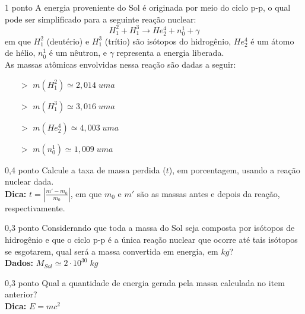 \documentclass{../lista}
\begin{document}
	\begin{questao}{1 ponto}
		A energia proveniente do Sol é originada por meio do ciclo p-p, o qual pode ser simplificado para a seguinte reação nuclear:
		\begin{equation}
			H_1^2 + H_1^3 \longrightarrow He_2^4 + n_0^1 + \gamma
		\end{equation}
		em que $H_1^2$ (deutério) e $H_1^3$ (trítio) são isótopos do hidrogênio, $He_2^4$ é um átomo de hélio, $n_0^1$ é um nêutron, e $\gamma$ representa a energia liberada. \\
		As massas atômicas envolvidas nessa reação são dadas a seguir:
		\begin{multicols}{2} \begin{itemize}
			\item[$>$] $m(H_1^2) \simeq 2,014 \; uma$
			\item[$>$] $m(H_1^3) \simeq 3,016 \; uma$
			\item[$>$] $m(He_2^4) \simeq 4,003 \; uma$
			\item[$>$] $m(n_0^1) \simeq 1,009 \; uma$
		\end{itemize} \end{multicols}

		\begin{pergunta}{0,4 ponto}
			Calcule a taxa de massa perdida ($t$), em porcentagem, usando a reação nuclear dada. \\
			\textbf{Dica:} $t= \left| \frac{m'-m_0}{m_0} \right|$, em que $m_0$ e $m'$ são as massas antes e depois da reação, respectivamente.
			
			\espacoCalculo
			\espacoRespostaPergunta
		\end{pergunta}

		\begin{pergunta}{0,3 ponto}
			Considerando que toda a massa do Sol seja composta por isótopos de hidrogênio e que o ciclo p-p é a única reação nuclear que ocorre até tais isótopos se esgotarem, qual será a massa convertida em energia, em $kg$? \\
			\textbf{Dados:} $M_{Sol} \simeq 2 \cdot 10^{30} \; kg$
			
			\espacoCalculo
			\espacoRespostaPergunta
		\end{pergunta}

		\begin{pergunta}{0,3 ponto}
			Qual a quantidade de energia gerada pela massa calculada no item anterior? \\
			\textbf{Dica:} $E = m c^2$
			
			\espacoCalculo
			\espacoRespostaPergunta
		\end{pergunta}
	\end{questao}
\end{document}
